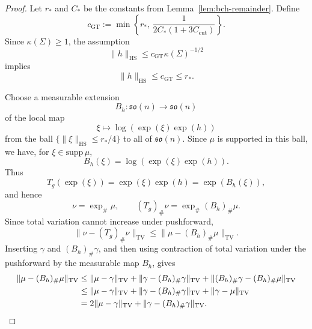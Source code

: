 \documentclass[10pt,a4paper]{amsart}
\newcommand{\HS}{\mathrm{HS}}
\newcommand{\TV}{\mathrm{TV}}
\newcommand{\so}{\mathfrak{so}}
\begin{document}
\begin{proof}
Let \(r_\ast\) and \(C_\ast\) be the constants from
Lemma~\ref{lem:bch-remainder}. Define
\[
c_{\mathrm{GT}}
:=
\min\left\{
r_\ast,\,
\frac{1}{2C_\ast(1+3C_{\mathrm{cut}})}
\right\}.
\]
Since \(\kappa(\Sigma)\ge 1\), the assumption
\[
\|h\|_{\HS}\le c_{\mathrm{GT}}\kappa(\Sigma)^{-1/2}
\]
implies
\[
\|h\|_{\HS}\le c_{\mathrm{GT}}\le r_\ast.
\]

Choose a measurable extension
\[
B_h:\so(n)\to\so(n)
\]
of the local map
\[
\xi\mapsto \log(\exp(\xi)\exp(h))
\]
from the ball \(\{\|\xi\|_{\HS}\le r_\ast/4\}\) to all of \(\so(n)\).
Since \(\mu\) is supported in this ball, we have, for \(\xi\in \mathrm{supp}\,\mu\),
\[
B_h(\xi)=\log(\exp(\xi)\exp(h)).
\]
Thus
\[
T_g(\exp(\xi))
=
\exp(\xi)\exp(h)
=
\exp(B_h(\xi)),
\]
and hence
\[
\nu=\exp_\#\mu,
\qquad
(T_g)_\#\nu=\exp_\#(B_h)_\#\mu.
\]
Since total variation cannot increase under pushforward,
\[
\|\nu-(T_g)_\#\nu\|_{\TV}
\le
\|\mu-(B_h)_\#\mu\|_{\TV}.
\]
Inserting \(\gamma\) and \((B_h)_\#\gamma\), and then using contraction of
total variation under the pushforward by the measurable map \(B_h\), gives
\begin{align}
\|\mu-(B_h)_\#\mu\|_{\TV}
&\le
\|\mu-\gamma\|_{\TV}
+
\|\gamma-(B_h)_\#\gamma\|_{\TV}
+
\|(B_h)_\#\gamma-(B_h)_\#\mu\|_{\TV}
\notag\\
&\le
\|\mu-\gamma\|_{\TV}
+
\|\gamma-(B_h)_\#\gamma\|_{\TV}
+
\|\gamma-\mu\|_{\TV}
\notag\\
&=
2\|\mu-\gamma\|_{\TV}
+
\|\gamma-(B_h)_\#\gamma\|_{\TV}.
\label{eq:transfer-triangle}
\end{align}


\end{proof}
\end{document}
